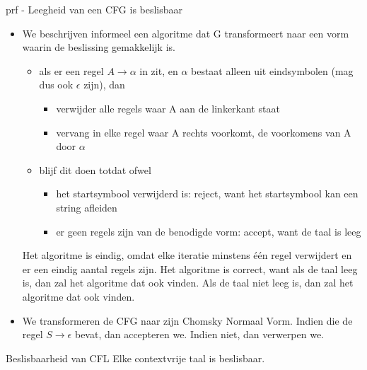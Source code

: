 \newpage

\begin{prf}{prf - Leegheid van een CFG is beslisbaar}
    \begin{itemize}
        \item 
            We beschrijven informeel een algoritme dat G transformeert naar een vorm waarin de beslissing gemakkelijk is.
            \begin{itemize}
                \item 
                    als er een regel $A \to \alpha$ in zit, en $\alpha$ bestaat alleen uit eindsymbolen (mag dus ook $\epsilon$ zijn), dan 
                    \begin{itemize}
                        \item verwijder alle regels waar A aan de linkerkant staat
                        \item vervang in elke regel waar A rechts voorkomt, de voorkomens van A door $\alpha$
                    \end{itemize}
                \item 
                    blijf dit doen totdat ofwel
                    \begin{itemize}
                        \item het startsymbool verwijderd is: reject, want het startsymbool kan een string afleiden
                        \item er geen regels zijn van de benodigde vorm: accept, want de taal is leeg
                    \end{itemize}
            \end{itemize}
            Het algoritme is eindig, omdat elke iteratie minstens één regel verwijdert en er een eindig aantal regels zijn. Het algoritme is correct, want als de taal leeg is, dan zal het algoritme dat ook vinden. Als de taal niet leeg is, dan zal het algoritme dat ook vinden.
        \item 
            We transformeren de CFG naar zijn Chomsky Normaal Vorm. Indien die de regel $S \to \epsilon$ bevat, dan accepteren we. Indien niet, dan verwerpen we.
    \end{itemize}
\end{prf}

\begin{lem}{Beslisbaarheid van CFL}
    Elke contextvrije taal is beslisbaar.
\end{lem}

